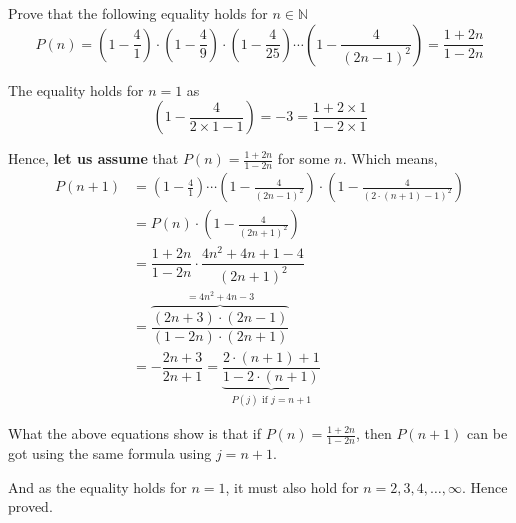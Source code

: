 
\question Prove that the following equality holds for $n\in\mathbb{N}$ 
\[ P(n) = \left(1-\frac{4}{1} \right)\cdot\left( 1-\frac{4}{9}\right)\cdot
\left( 1-\frac{4}{25} \right)\cdots\left(1-\frac{4}{(2n-1)^2}\right) = \dfrac{1+2n}{1-2n}\] 

\insertQR{}

\begin{solution}
  The equality holds for $n=1$ as
  \[ \left( 1-\frac{4}{2\times 1 - 1}\right) = -3 = \frac{1+2\times 1}{1-2\times 1} \]
  
  Hence, \textbf{let us assume} that $P(n) = \frac{1+2n}{1-2n}$ for some $n$. Which means, 
  \begin{align}
    P(n+1) &= \left( 1-\frac{4}{1} \right)\cdots\left(1-\frac{4}{(2n-1)^2} \right)\cdot\left( 1-\frac{4}{(2\cdot(n+1) - 1)^2} \right) \\
           &= P(n)\cdot\left( 1-\frac{4}{(2n+1)^2}\right) \\
           &= \dfrac{1+2n}{1-2n}\cdot\dfrac{4n^2+4n+1-4}{(2n+1)^2} \\
           &= \overbrace{\dfrac{(2n+3)\cdot(2n-1)}{(1-2n)\cdot (2n+1)}}^{= 4n^2+4n-3} \\
           &= -\dfrac{2n+3}{2n+1} = \underbrace{\dfrac{2\cdot(n+1) + 1}{1-2\cdot(n+1)}}_{P(j)\text{ if } j=n+1 }
  \end{align}

  What the above equations show is that if $P(n) = \frac{1+2n}{1-2n}$, then $P(n+1)$ can be got 
  using the same formula using $j=n+1$. 

  And as the equality holds for $n=1$, it must also hold for $n=2,3,4,\ldots,\infty$. Hence proved.
\end{solution}
